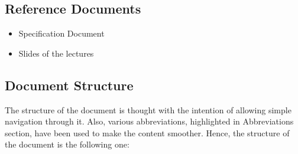 \documentclass{article}
\begin{document}
	\newpage
	
	\subsection{Reference Documents}
	
	\smallskip
	
	\begin{itemize}
		
		\item Specification Document
		\item Slides of the lectures
		
	\end{itemize} 
	
	\subsection{Document Structure}
	
	The structure of the document is thought with the intention of allowing simple navigation through it. Also, various abbreviations, highlighted in Abbreviations section, have been used to make the content smoother.
	Hence, the structure of the document is the following one:
	
\end{document}
